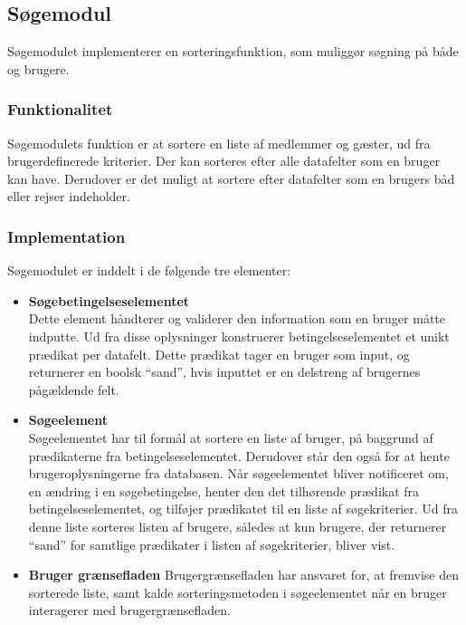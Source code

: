 \subsection{Søgemodul}
\label{sub:s_searchmodul}

Søgemodulet implementerer en sorteringsfunktion, som muliggør søgning på både og brugere.

\subsubsection{Funktionalitet}
\label{sub:funktionalitet}

Søgemodulets funktion er at sortere en liste af medlemmer og gæster, ud fra brugerdefinerede kriterier. Der kan sorteres efter alle datafelter som en bruger kan have. Derudover er det muligt at sortere efter datafelter som en brugers båd eller rejser indeholder.

\subsubsection{Implementation}
\label{sub:implementation}

Søgemodulet er inddelt i de følgende tre elementer:

\begin{itemize}
	\item \textbf{Søgebetingelseselementet} \\
		Dette element håndterer og validerer den information som en bruger måtte indputte. Ud fra disse oplysninger konstruerer betingelseselementet et unikt prædikat per datafelt. Dette prædikat tager en bruger som input, og returnerer en boolsk \enquote{sand}, hvis inputtet er en delstreng af brugernes pågældende felt.

	\item \textbf{Søgeelement} \\
    Søgeelementet har til formål at sortere en liste af bruger, på baggrund af prædikaterne fra betingelseselementet. Derudover står den også for at hente brugeroplysningerne fra databasen. Når søgeelementet bliver notificeret om, en ændring i en søgebetingelse, henter den det tilhørende prædikat fra betingelseselementet, og tilføjer prædikatet til en liste af søgekriterier. Ud fra denne liste sorteres listen af brugere, således at kun brugere, der returnerer \enquote{sand} for samtlige prædikater i listen af søgekriterier, bliver vist.

	\item \textbf{Bruger grænsefladen}
		Brugergrænsefladen har ansvaret for, at fremvise den sorterede liste, samt kalde sorteringsmetoden i søgeelementet når en bruger interagerer med brugergrænsefladen.
\end{itemize}



